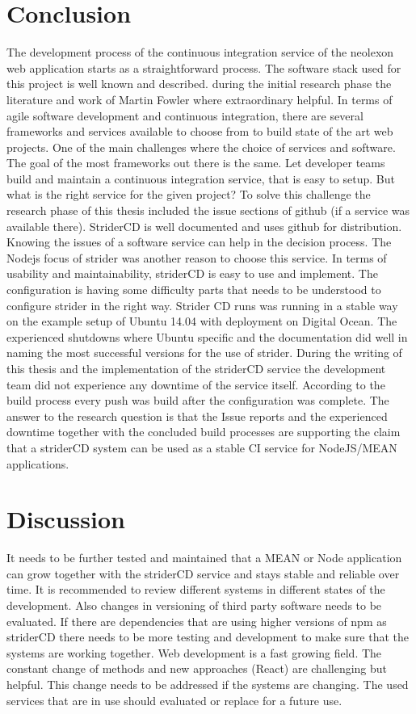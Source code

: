 \section{Conclusion}
\label{section:Conclusion}
The development process of the continuous integration service of the neolexon web application starts as a straightforward process. The software stack
used for this project is well known and described. during the initial research phase the literature and work of Martin Fowler where extraordinary
helpful. In terms of agile software development and continuous integration, there are several frameworks and services available to choose from to build
state of the art web projects. One of the main challenges where the choice of services and software. The goal of the most frameworks out there is
the same. Let developer teams build and maintain a continuous integration service, that is easy to setup. But what is the right service for the given project?
To solve this challenge the research phase of this thesis included the issue sections of github (if a service was available there). StriderCD is well
documented and uses github for distribution. Knowing the issues of a software service can help in the decision process. The Nodejs focus of strider
was another reason to choose this service. In terms of usability and maintainability, striderCD is easy to use and implement. The configuration is having
some difficulty parts that needs to be understood to configure strider in the right way. Strider CD runs was running in a stable way on the example setup
of Ubuntu 14.04 with deployment on Digital Ocean. The experienced shutdowns where Ubuntu specific and the documentation did well in naming the most
successful versions for the use of strider. During the writing of this thesis and the implementation of the striderCD service the development team did
not experience any downtime of the service itself. According to the build process every push was build after the configuration was complete. The answer
to the research question is that the Issue reports and the experienced downtime together with the concluded build processes are supporting the claim that
a striderCD system can be used as a stable CI service for NodeJS/MEAN applications.

\section{Discussion}
\label{section:Discussion}
It needs to be further tested and maintained that a MEAN or Node application can grow together with the striderCD service and stays stable and reliable
over time. It is recommended to review different systems in different states of the development. Also changes in versioning of third party software
needs to be evaluated. If there are dependencies that are using higher versions of npm as striderCD there needs to be more testing and development
to make sure that the systems are working together. Web development is a fast growing field. The constant change of methods and new approaches (React)
are challenging but helpful. This change needs to be addressed if the systems are changing. The used services that are in use should evaluated or replace
for a future use.

